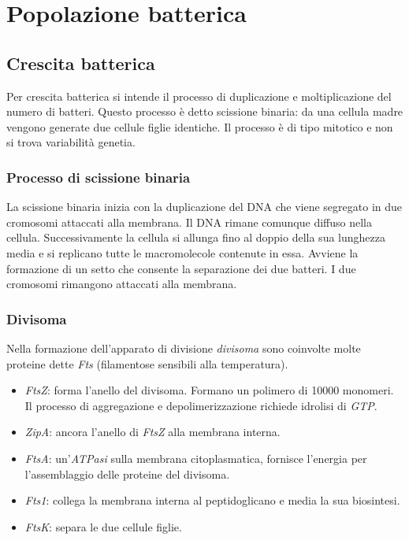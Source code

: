 \chapter{Popolazione batterica}

\section{Crescita batterica}
Per crescita batterica si intende il processo di duplicazione e moltiplicazione del numero di batteri.
Questo processo \`e detto scissione binaria: da una cellula madre vengono generate due cellule figlie identiche.
Il processo \`e di tipo mitotico e non si trova variabilit\`a genetia.

	\subsection{Processo di scissione binaria}
	La scissione binaria inizia con la duplicazione del DNA che viene segregato in due cromosomi attaccati alla membrana.
	Il DNA rimane comunque diffuso nella cellula.
	Successivamente la cellula si allunga fino al doppio della sua lunghezza media e si replicano tutte le macromolecole contenute in essa.
	Avviene la formazione di un setto che consente la separazione dei due batteri.
	I due cromosomi rimangono attaccati alla membrana.

	\subsection{Divisoma}
	Nella formazione dell'apparato di divisione \emph{divisoma} sono coinvolte molte proteine dette \emph{Fts} (filamentose sensibili alla temperatura).
	\begin{multicols}{2}
		\begin{itemize}
			\item \emph{FtsZ}: forma l'anello del divisoma.
				Formano un polimero di \num{10000} monomeri.
				Il processo di aggregazione e depolimerizzazione richiede idrolisi di \emph{GTP}.
			\item \emph{ZipA}: ancora l'anello di \emph{FtsZ} alla membrana interna.
			\item \emph{FtsA}: un'\emph{ATPasi} sulla membrana citoplasmatica, fornisce l'energia per l'assemblaggio delle proteine del divisoma.
			\item \emph{Fts1}: collega la membrana interna al peptidoglicano e media la sua biosintesi.
			\item \emph{FtsK}: separa le due cellule figlie.
		\end{itemize}
	\end{multicols}

